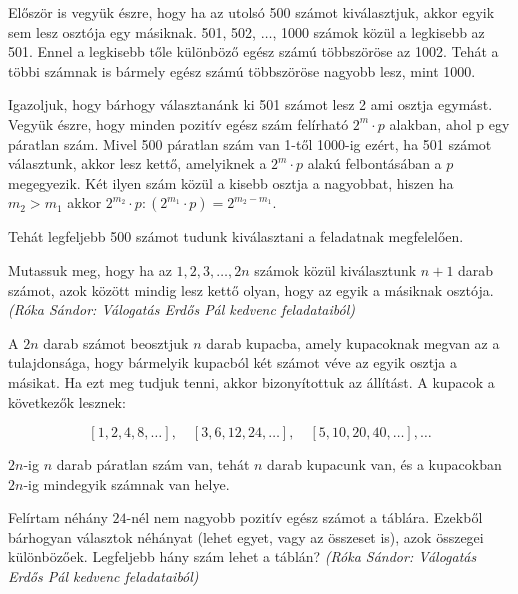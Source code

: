 \begin{solution}
	Először is vegyük észre, hogy ha az utolsó 500 számot kiválasztjuk,
	akkor egyik sem lesz osztója egy másiknak. 501, 502, $\dots$, 1000
	számok közül a legkisebb az 501. Ennel a legkisebb tőle különböző
	egész számú többszöröse az 1002. Tehát a többi számnak is bármely
	egész számú többszöröse nagyobb lesz, mint 1000.
	
	Igazoljuk, hogy bárhogy választanánk ki 501 számot lesz 2 ami osztja
	egymást. Vegyük észre, hogy minden pozitív egész szám felírható $2^{m}\cdot p$
	alakban, ahol p egy páratlan szám. Mivel 500 páratlan szám van 1-től
	1000-ig ezért, ha 501 számot választunk, akkor lesz kettő, amelyiknek
	a $2^{m}\cdot p$ alakú felbontásában a $p$ megegyezik. Két ilyen
	szám közül a kisebb osztja a nagyobbat, hiszen ha $m_{2}>m_{1}$ akkor
	$2^{m_{2}}\cdot p:(2^{m_{1}}\cdot p)=2^{m_{2}-m_{1}}$.
	
	Tehát legfeljebb 500 számot tudunk kiválasztani a feladatnak megfelelően. 
\end{solution}
\begin{extraproblem}
	Mutassuk meg, hogy ha az $1,2,3,\dots,2n$ számok közül kiválasztunk
	$n+1$ darab számot, azok között mindig lesz kettő olyan, hogy az
	egyik a másiknak osztója. \emph{(Róka Sándor: Válogatás Erdős Pál
		kedvenc feladataiból) }
\end{extraproblem}

\begin{solution}
	A $2n$ darab számot beosztjuk $n$ darab kupacba, amely kupacoknak
	megvan az a tulajdonsága, hogy bármelyik kupacból két számot véve
	az egyik osztja a másikat. Ha ezt meg tudjuk tenni, akkor bizonyítottuk
	az állítást. A kupacok a következők lesznek:
	
	\[
	[1,2,4,8,\dots],\quad[3,6,12,24,\dots],\quad[5,10,20,40,\dots],\dots
	\]
	
	$2n$-ig $n$ darab páratlan szám van, tehát $n$ darab kupacunk van,
	és a kupacokban $2n$-ig mindegyik számnak van helye.
\end{solution}
\begin{extraproblem}
	Felírtam néhány $24$-nél nem nagyobb pozitív egész számot a táblára.
	Ezekből bárhogyan választok néhányat (lehet egyet, vagy az összeset
	is), azok összegei különbözőek. Legfeljebb hány szám lehet a táblán?
	\emph{(Róka Sándor: Válogatás Erdős Pál kedvenc feladataiból)}
\end{extraproblem}

